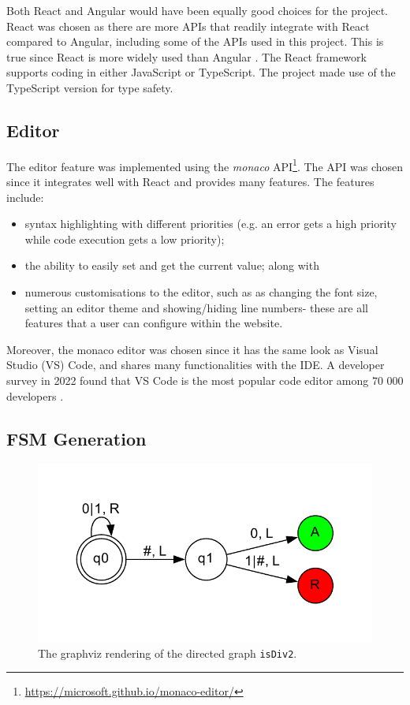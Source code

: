 Both React and Angular would have been equally good choices for the project. React was chosen as there are more APIs that readily integrate with React compared to Angular, including some of the APIs used in this project. This is true since React is more widely used than Angular \citep{react_v_angular}. The React framework supports coding in either JavaScript or TypeScript. The project made use of the TypeScript version for type safety.

\subsection{Editor}

The editor feature was implemented using the \emph{monaco} API\footnote{\url{https://microsoft.github.io/monaco-editor/}}. The API was chosen since it integrates well with React and provides many features. The features include:
\begin{itemize}
    \item syntax highlighting with different priorities (e.g. an error gets a high priority while code execution gets a low priority);
    \item the ability to easily set and get the current value; along with
    \item numerous customisations to the editor, such as as changing the font size, setting an editor theme and showing/hiding line numbers- these are all features that a user can configure within the website.
\end{itemize}
Moreover, the monaco editor was chosen since it has the same look as Visual Studio (VS) Code, and shares many functionalities with the IDE. A developer survey in 2022 found that VS Code is the most popular code editor among 70 000 developers \citep{stack_overflow}.

\subsection{FSM Generation}
\begin{figure}[htb]
    \centering
    \includegraphics[scale=0.6]{images/graphviz_isDiv2.pdf}
    \caption{The graphviz rendering of the directed graph \texttt{isDiv2}.}
    \label{fig:graphviz_isDiv2}
\end{figure}

